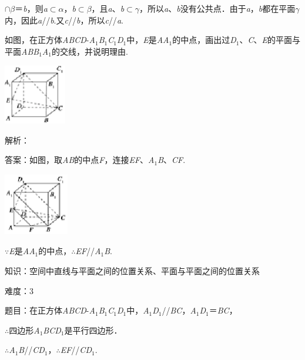 \documentclass{article} %
\begin{document}
$\mathrm{\cap}$\textit{$\beta$}＝\textit{b}，则\textit{a}$\mathrm{\subset }$\textit{$\alpha$}，\textit{b}$\mathrm{\subset }$\textit{$\beta$}，且\textit{a}、\textit{b}$\mathrm{\subset }$\textit{$\gamma$}，所以\textit{a}、\textit{b}没有公共点．由于\textit{a}，\textit{b}都在平面\textit{$\gamma$}内，因此\textit{a}//\textit{b}.又\textit{c}//\textit{b}，所以\textit{c}//\textit{a}.

如图，在正方体\textit{ABCD}-\textit{A}${}_{1}$\textit{B}${}_{1}$\textit{C}${}_{1}$\textit{D}${}_{1}$中，\textit{E}是\textit{AA}${}_{1}$的中点，画出过\textit{D}${}_{1}$、\textit{C}、\textit{E}的平面与平面\textit{ABB}${}_{1}$\textit{A}${}_{1}$的交线，并说明理由.

\includegraphics*[width=1.07in, height=1.03in, keepaspectratio=false]{image126}

解析：

答案：如图，取\textit{AB}的中点\textit{F}，连接\textit{EF}、\textit{A}${}_{1}$\textit{B}、\textit{CF}.

\includegraphics*[width=1.11in, height=1.07in, keepaspectratio=false]{image127}

$\mathrm{\because}$\textit{E}是\textit{AA}${}_{1}$的中点，$\mathrm{\therefore}$\textit{EF}//\textit{A}${}_{1}$\textit{B}.

知识：空间中直线与平面之间的位置关系、平面与平面之间的位置关系

难度：3

题目：在正方体\textit{ABCD}-\textit{A}${}_{1}$\textit{B}${}_{1}$\textit{C}${}_{1}$\textit{D}${}_{1}$中，\textit{A}${}_{1}$\textit{D}${}_{1}$//\textit{BC}，\textit{A}${}_{1}$\textit{D}${}_{1}$＝\textit{BC}，

$\mathrm{\therefore}$四边形\textit{A}${}_{1}$\textit{BCD}${}_{1}$是平行四边形．

$\mathrm{\therefore}$\textit{A}${}_{1}$\textit{B}//\textit{CD}${}_{1}$，$\mathrm{\therefore}$\textit{EF}//\textit{CD}${}_{1}$.
\end{document}
